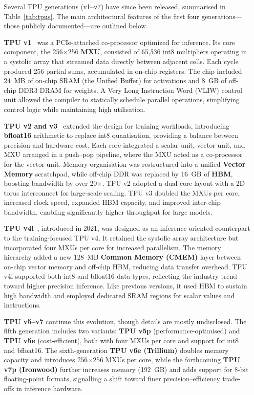 Several TPU generations (v1–v7) have since been released, summarised in Table~\ref{tab:tpus}. The main architectural features of the first four generations—those publicly documented—are outlined below.

\textbf{TPU v1}~\cite{Jouppi2017} was a PCIe-attached co-processor optimized for inference. Its core component, the 256×256 \textbf{MXU}, consisted of 65,536 int8 multipliers operating in a systolic array that streamed data directly between adjacent cells. Each cycle produced 256 partial sums, accumulated in on-chip registers. The chip included 24~MB of on-chip SRAM (the Unified Buffer) for activations and 8~GB of off-chip DDR3 DRAM for weights. A Very Long Instruction Word (VLIW) control unit allowed the compiler to statically schedule parallel operations, simplifying control logic while maintaining high utilisation.

\textbf{TPU v2 and v3}~\cite{Norrie2021} extended the design for training workloads, introducing \textbf{bfloat16} arithmetic to replace int8 quantisation, providing a balance between precision and hardware cost. Each core integrated a scalar unit, vector unit, and MXU arranged in a push–pop pipeline, where the MXU acted as a co-processor for the vector unit. Memory organisation was restructured into a unified \textbf{Vector Memory} scratchpad, while off-chip DDR was replaced by 16~GB of \textbf{HBM}, boosting bandwidth by over 20×. TPU v2 adopted a dual-core layout with a 2D torus interconnect for large-scale scaling. TPU v3 doubled the MXUs per core, increased clock speed, expanded HBM capacity, and improved inter-chip bandwidth, enabling significantly higher throughput for large models.

\textbf{TPU v4i}~\cite{Jouppi2021}, introduced in 2021, was designed as an inference-oriented counterpart to the training-focused TPU v4. It retained the systolic array architecture but incorporated four MXUs per core for increased parallelism. The memory hierarchy added a new 128~MB \textbf{Common Memory (CMEM)} layer between on-chip vector memory and off-chip HBM, reducing data transfer overhead. TPU v4i supported both int8 and bfloat16 data types, reflecting the industry trend toward higher precision inference. Like previous versions, it used HBM to sustain high bandwidth and employed dedicated SRAM regions for scalar values and instructions.

\textbf{TPU v5–v7} continue this evolution, though details are mostly undisclosed. The fifth generation includes two variants: \textbf{TPU v5p} (performance-optimised) and \textbf{TPU v5e} (cost-efficient), both with four MXUs per core and support for int8 and bfloat16. The sixth-generation \textbf{TPU v6e (Trillium)} doubles memory capacity and introduces 256×256 MXUs per core, while the forthcoming \textbf{TPU v7p (Ironwood)} further increases memory (192~GB) and adds support for 8-bit floating-point formats, signalling a shift toward finer precision–efficiency trade-offs in inference hardware.

